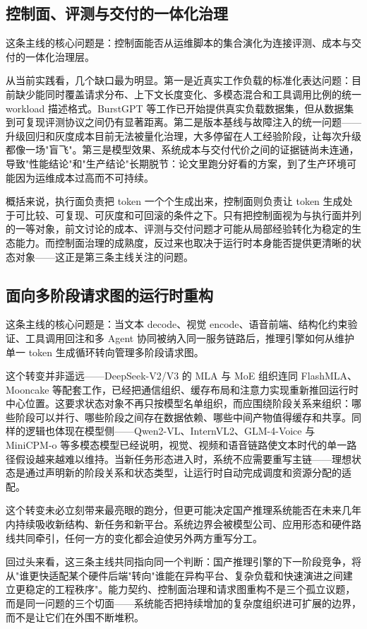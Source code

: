 \subsection{控制面、评测与交付的一体化治理}

这条主线的核心问题是：控制面能否从运维脚本的集合演化为连接评测、成本与交付的一体化治理层。

从当前实践看，几个缺口最为明显。第一是近真实工作负载的标准化表达问题：目前缺少能同时覆盖请求分布、上下文长度变化、多模态混合和工具调用比例的统一 workload 描述格式。BurstGPT 等工作已开始提供真实负载数据集\citep{wang2025burstgpt}，但从数据集到可复现评测协议之间仍有显著距离。第二是版本基线与故障注入的统一问题——升级回归和灰度成本目前无法被量化治理，大多停留在人工经验阶段，让每次升级都像一场"盲飞"。第三是模型效果、系统成本与交付代价之间的证据链尚未连通，导致"性能结论"和"生产结论"长期脱节：论文里跑分好看的方案，到了生产环境可能因为运维成本过高而不可持续。

概括来说，执行面负责把 token 一个个生成出来，控制面则负责让 token 生成处于可比较、可复现、可灰度和可回滚的条件之下。只有把控制面视为与执行面并列的一等对象，前文讨论的成本、评测与交付问题才可能从局部经验转化为稳定的生态能力。而控制面治理的成熟度，反过来也取决于运行时本身能否提供更清晰的状态对象——这正是第三条主线关注的问题。

\subsection{面向多阶段请求图的运行时重构}

这条主线的核心问题是：当文本 decode、视觉 encode、语音前端、结构化约束验证、工具调用回注和多 Agent 协同被纳入同一服务链路后，推理引擎如何从维护单一 token 生成循环转向管理多阶段请求图。

这个转变并非遥远——DeepSeek-V2/V3 的 MLA 与 MoE 组织连同 FlashMLA、Mooncake 等配套工作，已经把通信组织、缓存布局和注意力实现重新推回运行时中心位置\citep{liu2024deepseekv2,deepseekv3,deepseekflashmla,qin2024mooncake}。这要求状态对象不再只按模型名单组织，而应围绕阶段关系来组织：哪些阶段可以并行、哪些阶段之间存在数据依赖、哪些中间产物值得缓存和共享。同样的逻辑也体现在模型侧——Qwen2-VL、InternVL2、GLM-4-Voice 与 MiniCPM-o 等多模态模型已经说明，视觉、视频和语音链路使文本时代的单一路径假设越来越难以维持\citep{wang2024qwen2vl,chen2024internvl2,zeng2024glm4voice,cui2026minicpmo45}。当新任务形态进入时，系统不应需要重写主链——理想状态是通过声明新的阶段关系和状态类型，让运行时自动完成调度和资源分配的适配。

这个转变未必立刻带来最亮眼的跑分，但更可能决定国产推理系统能否在未来几年内持续吸收新结构、新任务和新平台。系统边界会被模型公司、应用形态和硬件路线共同牵引，任何一方的变化都会迫使另外两方重写分工。

回过头来看，这三条主线共同指向同一个判断：国产推理引擎的下一阶段竞争，将从"谁更快适配某个硬件后端"转向"谁能在异构平台、复杂负载和快速演进之间建立更稳定的工程秩序"。能力契约、控制面治理和请求图重构不是三个孤立议题，而是同一问题的三个切面——系统能否把持续增加的复杂度组织进可扩展的边界，而不是让它们在外围不断堆积。
